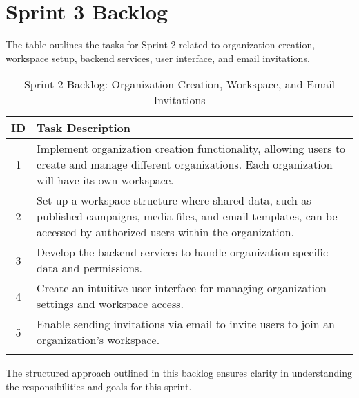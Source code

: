 \section{Sprint 3 Backlog}
The table outlines the tasks for Sprint 2 related to organization creation, workspace setup, backend services, user interface, and email invitations. 
\begin{longtable}{|c|p{}|}
    \hline
    \textbf{ID} & \textbf{Task Description} \\
    \hline
    1 & Implement organization creation functionality, allowing users to create and manage different organizations. Each organization will have its own workspace. \\
    \hline
    2 & Set up a workspace structure where shared data, such as published campaigns, media files, and email templates, can be accessed by authorized users within the organization. \\
    \hline
    3 & Develop the backend services to handle organization-specific data and permissions. \\
    \hline
    4 & Create an intuitive user interface for managing organization settings and workspace access. \\
    \hline
    5 & Enable sending invitations via email to invite users to join an organization's workspace. \\
    \hline
    \caption{Sprint 2 Backlog: Organization Creation, Workspace, and Email Invitations}
    \label{tab:Sprint2Backlog}
\end{longtable}

The structured approach outlined in this backlog ensures clarity in understanding the responsibilities and goals for this sprint.
